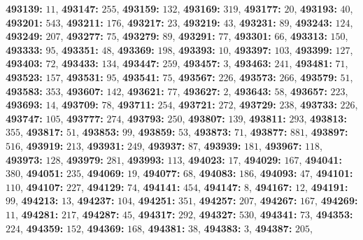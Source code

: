 \textsf{\bfseries 493139:} $11$, \textsf{\bfseries 493147:} $255$, \textsf{\bfseries 493159:} $132$, \textsf{\bfseries 493169:} $319$, \textsf{\bfseries 493177:} $20$, \textsf{\bfseries 493193:} $40$, \textsf{\bfseries 493201:} $543$, \textsf{\bfseries 493211:} $176$, \textsf{\bfseries 493217:} $23$, \textsf{\bfseries 493219:} $43$, \textsf{\bfseries 493231:} $89$, \textsf{\bfseries 493243:} $124$, \textsf{\bfseries 493249:} $207$, \textsf{\bfseries 493277:} $75$, \textsf{\bfseries 493279:} $89$, \textsf{\bfseries 493291:} $77$, \textsf{\bfseries 493301:} $66$, \textsf{\bfseries 493313:} $150$, \textsf{\bfseries 493333:} $95$, \textsf{\bfseries 493351:} $48$, \textsf{\bfseries 493369:} $198$, \textsf{\bfseries 493393:} $10$, \textsf{\bfseries 493397:} $103$, \textsf{\bfseries 493399:} $127$, \textsf{\bfseries 493403:} $72$, \textsf{\bfseries 493433:} $134$, \textsf{\bfseries 493447:} $259$, \textsf{\bfseries 493457:} $3$, \textsf{\bfseries 493463:} $241$, \textsf{\bfseries 493481:} $71$, \textsf{\bfseries 493523:} $157$, \textsf{\bfseries 493531:} $95$, \textsf{\bfseries 493541:} $75$, \textsf{\bfseries 493567:} $226$, \textsf{\bfseries 493573:} $266$, \textsf{\bfseries 493579:} $51$, \textsf{\bfseries 493583:} $353$, \textsf{\bfseries 493607:} $142$, \textsf{\bfseries 493621:} $77$, \textsf{\bfseries 493627:} $2$, \textsf{\bfseries 493643:} $58$, \textsf{\bfseries 493657:} $223$, \textsf{\bfseries 493693:} $14$, \textsf{\bfseries 493709:} $78$, \textsf{\bfseries 493711:} $254$, \textsf{\bfseries 493721:} $272$, \textsf{\bfseries 493729:} $238$, \textsf{\bfseries 493733:} $226$, \textsf{\bfseries 493747:} $105$, \textsf{\bfseries 493777:} $274$, \textsf{\bfseries 493793:} $250$, \textsf{\bfseries 493807:} $139$, \textsf{\bfseries 493811:} $293$, \textsf{\bfseries 493813:} $355$, \textsf{\bfseries 493817:} $51$, \textsf{\bfseries 493853:} $99$, \textsf{\bfseries 493859:} $53$, \textsf{\bfseries 493873:} $71$, \textsf{\bfseries 493877:} $881$, \textsf{\bfseries 493897:} $516$, \textsf{\bfseries 493919:} $213$, \textsf{\bfseries 493931:} $249$, \textsf{\bfseries 493937:} $87$, \textsf{\bfseries 493939:} $181$, \textsf{\bfseries 493967:} $118$, \textsf{\bfseries 493973:} $128$, \textsf{\bfseries 493979:} $281$, \textsf{\bfseries 493993:} $113$, \textsf{\bfseries 494023:} $17$, \textsf{\bfseries 494029:} $167$, \textsf{\bfseries 494041:} $380$, \textsf{\bfseries 494051:} $235$, \textsf{\bfseries 494069:} $19$, \textsf{\bfseries 494077:} $68$, \textsf{\bfseries 494083:} $186$, \textsf{\bfseries 494093:} $47$, \textsf{\bfseries 494101:} $110$, \textsf{\bfseries 494107:} $227$, \textsf{\bfseries 494129:} $74$, \textsf{\bfseries 494141:} $454$, \textsf{\bfseries 494147:} $8$, \textsf{\bfseries 494167:} $12$, \textsf{\bfseries 494191:} $99$, \textsf{\bfseries 494213:} $13$, \textsf{\bfseries 494237:} $104$, \textsf{\bfseries 494251:} $351$, \textsf{\bfseries 494257:} $207$, \textsf{\bfseries 494267:} $167$, \textsf{\bfseries 494269:} $11$, \textsf{\bfseries 494281:} $217$, \textsf{\bfseries 494287:} $45$, \textsf{\bfseries 494317:} $292$, \textsf{\bfseries 494327:} $530$, \textsf{\bfseries 494341:} $73$, \textsf{\bfseries 494353:} $224$, \textsf{\bfseries 494359:} $152$, \textsf{\bfseries 494369:} $168$, \textsf{\bfseries 494381:} $38$, \textsf{\bfseries 494383:} $3$, \textsf{\bfseries 494387:} $205$, 
